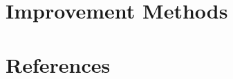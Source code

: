 \documentclass[11pt,a4paper]{article}
\begin{document}

\newpage





\section{Improvement Methods}
\label{sec:f}







\clearpage
\section{References}
\label{sec:i}

\renewcommand{\bibsection}{}
\begingroup
\small
\raggedright
\setlength{\bibsep}{0.35em}

\endgroup
\end{document}
